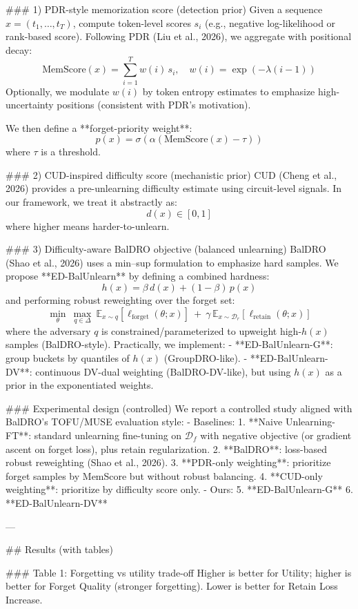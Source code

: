 ### 1) PDR-style memorization score (detection prior)  
Given a sequence \(x = (t_1,\dots,t_T)\), compute token-level scores \(s_i\) (e.g., negative log-likelihood or rank-based score). Following PDR (Liu et al., 2026), we aggregate with positional decay:
\[
\text{MemScore}(x)=\sum_{i=1}^{T} w(i)\, s_i,\quad w(i)=\exp(-\lambda (i-1))
\]
Optionally, we modulate \(w(i)\) by token entropy estimates to emphasize high-uncertainty positions (consistent with PDR’s motivation).

We then define a **forget-priority weight**:
\[
p(x)=\sigma(\alpha(\text{MemScore}(x)-\tau))
\]
where \(\tau\) is a threshold.

### 2) CUD-inspired difficulty score (mechanistic prior)  
CUD (Cheng et al., 2026) provides a pre-unlearning difficulty estimate using circuit-level signals. In our framework, we treat it abstractly as:
\[
d(x)\in[0,1]
\]
where higher means harder-to-unlearn.

### 3) Difficulty-aware BalDRO objective (balanced unlearning)  
BalDRO (Shao et al., 2026) uses a min–sup formulation to emphasize hard samples. We propose **ED-BalUnlearn** by defining a combined hardness:
\[
h(x)=\beta\, d(x) + (1-\beta)\, p(x)
\]
and performing robust reweighting over the forget set:
\[
\min_{\theta}\ \max_{q \in \Delta}\ \mathbb{E}_{x\sim q}[\ell_{\text{forget}}(\theta;x)]\ +\ \gamma\,\mathbb{E}_{x\sim \mathcal{D}_r}[\ell_{\text{retain}}(\theta;x)]
\]
where the adversary \(q\) is constrained/parameterized to upweight high-\(h(x)\) samples (BalDRO-style). Practically, we implement:
- **ED-BalUnlearn-G**: group buckets by quantiles of \(h(x)\) (GroupDRO-like).
- **ED-BalUnlearn-DV**: continuous DV-dual weighting (BalDRO-DV-like), but using \(h(x)\) as a prior in the exponentiated weights.

### Experimental design (controlled)  
We report a controlled study aligned with BalDRO’s TOFU/MUSE evaluation style:
- Baselines:
  1. **Naive Unlearning-FT**: standard unlearning fine-tuning on \(\mathcal{D}_f\) with negative objective (or gradient ascent on forget loss), plus retain regularization.
  2. **BalDRO**: loss-based robust reweighting (Shao et al., 2026).
  3. **PDR-only weighting**: prioritize forget samples by MemScore but without robust balancing.
  4. **CUD-only weighting**: prioritize by difficulty score only.
- Ours:
  5. **ED-BalUnlearn-G**
  6. **ED-BalUnlearn-DV**

---

## Results (with tables)

### Table 1: Forgetting vs utility trade-off  
Higher is better for Utility; higher is better for Forget Quality (stronger forgetting). Lower is better for Retain Loss Increase.

